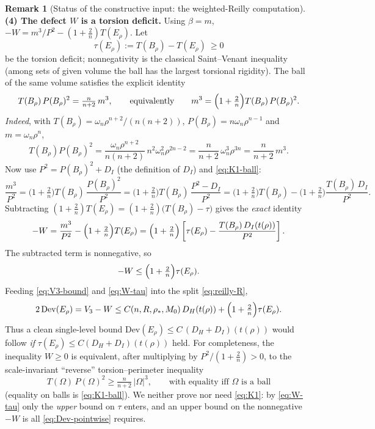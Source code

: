 \documentclass[11pt]{amsart}
\theoremstyle{definition}
\newtheorem{remark}[theorem]{Remark}
\newcommand{\Om}{\Omega}
\newcommand{\rstar}{\rho_*}
\newcommand{\Per}{P}
\begin{document}
\begin{remark}[Status of the constructive input: the weighted-Reilly computation]
\medskip
\noindent\textbf{(4) The defect \(W\) is a torsion deficit.}
Using \(\beta=m\), \(-W=m^3/P^2-(1+\tfrac2n)T(E_\rho)\).  Let
\[
   \tau(E_\rho):=T(B_\rho)-T(E_\rho)\ \ge0
\]
be the torsion deficit; nonnegativity is the classical Saint--Venant inequality
(among sets of given volume the ball has the largest torsional rigidity).  The
ball of the same volume satisfies the explicit identity
\begin{equation}\label{eq:K1-ball}
   T(B_\rho)\,\Per(B_\rho)^2=\tfrac{n}{n+2}\,m^3,
   \qquad\text{equivalently}\qquad
   m^3=\Bigl(1+\tfrac2n\Bigr)T(B_\rho)\,\Per(B_\rho)^2 .
\end{equation}
\emph{Indeed}, with \(T(B_\rho)=\omega_n\rho^{n+2}/(n(n+2))\),
\(\Per(B_\rho)=n\omega_n\rho^{n-1}\) and \(m=\omega_n\rho^n\),
\[
   T(B_\rho)\Per(B_\rho)^2
   =\frac{\omega_n\rho^{n+2}}{n(n+2)}\,n^2\omega_n^2\rho^{2n-2}
   =\frac{n}{n+2}\,\omega_n^3\rho^{3n}
   =\frac{n}{n+2}\,m^3 .
\]
Now use \(P^2=\Per(B_\rho)^2+D_I\) (the definition of \(D_I\)) and
\eqref{eq:K1-ball}:
\[
   \frac{m^3}{P^2}
   =\bigl(1+\tfrac2n\bigr)T(B_\rho)\,\frac{\Per(B_\rho)^2}{P^2}
   =\bigl(1+\tfrac2n\bigr)T(B_\rho)\,\frac{P^2-D_I}{P^2}
   =\bigl(1+\tfrac2n\bigr)T(B_\rho)
     -\bigl(1+\tfrac2n\bigr)\frac{T(B_\rho)\,D_I}{P^2}.
\]
Subtracting \((1+\tfrac2n)T(E_\rho)=(1+\tfrac2n)\bigl(T(B_\rho)-\tau\bigr)\)
gives the \emph{exact} identity
\begin{equation}\label{eq:W-exact}
   -W=\frac{m^3}{P^2}-\Bigl(1+\tfrac2n\Bigr)T(E_\rho)
   =\Bigl(1+\tfrac2n\Bigr)\left[\tau(E_\rho)-\frac{T(B_\rho)\,D_I(t(\rho))}{P^2}\right].
\end{equation}
The subtracted term is nonnegative, so
\begin{equation}\label{eq:W-tau}
   -W\le\Bigl(1+\tfrac2n\Bigr)\tau(E_\rho).
\end{equation}
Feeding \eqref{eq:V3-bound} and \eqref{eq:W-tau} into the split
\eqref{eq:reilly-R},
\begin{equation}\label{eq:Dev-pointwise}
   2\,\mathrm{Dev}(E_\rho)=V_3-W
   \le C(n,R,\rstar,M_0)\,D_H(t(\rho))+\Bigl(1+\tfrac2n\Bigr)\tau(E_\rho).
\end{equation}
Thus a clean single-level bound \(\mathrm{Dev}(E_\rho)\le C\,(D_H+D_I)(t(\rho))\)
would follow \emph{if} \(\tau(E_\rho)\le C(D_H+D_I)(t(\rho))\) held.  For
completeness, the inequality \(W\ge0\) is equivalent, after multiplying by
\(P^2/(1+\tfrac2n)>0\), to the scale-invariant ``reverse'' torsion--perimeter
inequality
\begin{equation}\label{eq:K1}
   T(\Om)\,\Per(\Om)^2\ge\tfrac{n}{n+2}\,|\Om|^3,
   \qquad\text{with equality iff \(\Om\) is a ball}
\end{equation}
(equality on balls is \eqref{eq:K1-ball}).  We neither prove nor need
\eqref{eq:K1}: by \eqref{eq:W-tau} only the \emph{upper} bound on \(\tau\)
enters, and an upper bound on the nonnegative \(-W\) is all
\eqref{eq:Dev-pointwise} requires.


\end{remark}
\end{document}
